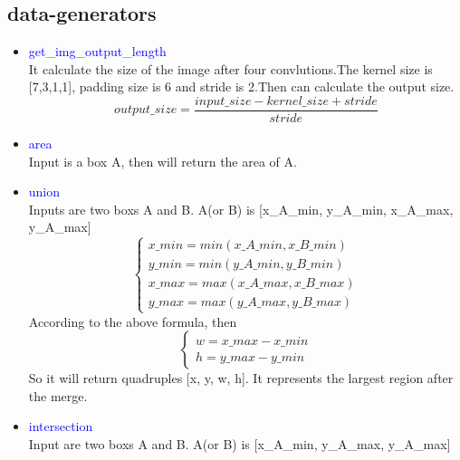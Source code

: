 \documentclass[UTF8,a4paper,11pt]{ctexart}
\begin{document}
    \subsection{data-generators} 
        \begin{itemize}
            \item {\textcolor{blue}{get\_img\_output\_length}} \\
            It calculate the size of the image after four convlutions.The kernel size is [7,3,1,1], padding size is 6 and stride is 2.Then can calculate the output size.
                \begin{equation}
                    output\_size = \frac{input\_size - kernel\_size + stride }{stride}
                \end{equation}
            \item {\textcolor{blue}{area}} \\
            Input is a box A, then will return the area of A.
            \item {\textcolor{blue}{union}} \\
            Inputs are two boxs A and B. A(or B) is [x\_A\_min, y\_A\_min, x\_A\_max, y\_A\_max] 
            \begin{equation}
                \begin{cases}
                    x\_min = min(x\_A\_min, x\_B\_min) \\
                    y\_min = min(y\_A\_min, y\_B\_min) \\
                    x\_max = max(x\_A\_max, x\_B\_max) \\
                    y\_max = max(y\_A\_max, y\_B\_max)
                \end{cases}
            \end{equation}
            According to the above formula, then
            \begin{equation}
                \begin{cases}
                    w = x\_max - x\_min \\
                    h = y\_max - y\_min
                \end{cases}
            \end{equation}
            So it will return quadruples [x, y, w, h]. It represents the largest region after the merge.
            \item {\textcolor{blue}{intersection}} \\
            Input are two boxs A and B. A(or B) is [x\_A\_min, y\_A\_max, y\_A\_max]

\end{itemize}
\end{document}
